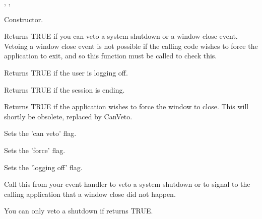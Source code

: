 ,\rtfsp
{},\rtfsp
{}




Constructor.

\label{wxcloseeventcanveto}


Returns TRUE if you can veto a system shutdown or a window close event.
Vetoing a window close event is not possible if the calling code wishes to
force the application to exit, and so this function must be called to check this.

\label{wxcloseeventgetloggingoff}


Returns TRUE if the user is logging off.

\label{wxcloseeventgetsessionending}


Returns TRUE if the session is ending.

\label{wxcloseeventgetforce}


Returns TRUE if the application wishes to force the window to close.
This will shortly be obsolete, replaced by CanVeto.

\label{wxcloseeventsetcanveto}


Sets the 'can veto' flag.

\label{wxcloseeventsetforce}


Sets the 'force' flag.

\label{wxcloseeventsetloggingoff}


Sets the 'logging off' flag.

\label{wxcloseeventveto}


Call this from your event handler to veto a system shutdown or to signal
to the calling application that a window close did not happen.

You can only veto a shutdown if  returns
TRUE.


